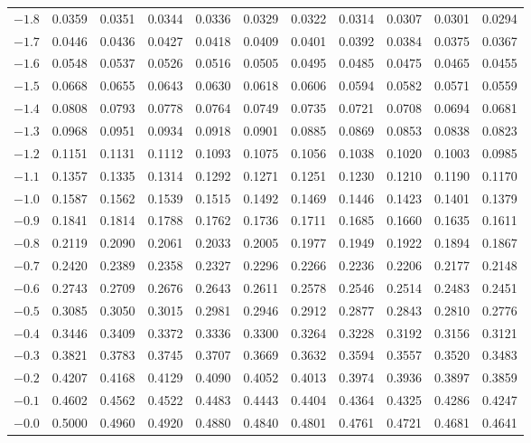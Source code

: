 \begin{table}[H]
\begin{tabular}{c|cccccccccc}
$-1.8$ & 0.0359 & 0.0351 & 0.0344 & 0.0336 & 0.0329 & 0.0322 & 0.0314 & 0.0307 & 0.0301 & 0.0294 \\
$-1.7$ & 0.0446 & 0.0436 & 0.0427 & 0.0418 & 0.0409 & 0.0401 & 0.0392 & 0.0384 & 0.0375 & 0.0367 \\
$-1.6$ & 0.0548 & 0.0537 & 0.0526 & 0.0516 & 0.0505 & 0.0495 & 0.0485 & 0.0475 & 0.0465 & 0.0455 \\
$-1.5$ & 0.0668 & 0.0655 & 0.0643 & 0.0630 & 0.0618 & 0.0606 & 0.0594 & 0.0582 & 0.0571 & 0.0559 \\
$-1.4$ & 0.0808 & 0.0793 & 0.0778 & 0.0764 & 0.0749 & 0.0735 & 0.0721 & 0.0708 & 0.0694 & 0.0681 \\
$-1.3$ & 0.0968 & 0.0951 & 0.0934 & 0.0918 & 0.0901 & 0.0885 & 0.0869 & 0.0853 & 0.0838 & 0.0823 \\
$-1.2$ & 0.1151 & 0.1131 & 0.1112 & 0.1093 & 0.1075 & 0.1056 & 0.1038 & 0.1020 & 0.1003 & 0.0985 \\
$-1.1$ & 0.1357 & 0.1335 & 0.1314 & 0.1292 & 0.1271 & 0.1251 & 0.1230 & 0.1210 & 0.1190 & 0.1170 \\
$-1.0$ & 0.1587 & 0.1562 & 0.1539 & 0.1515 & 0.1492 & 0.1469 & 0.1446 & 0.1423 & 0.1401 & 0.1379 \\
$-0.9$ & 0.1841 & 0.1814 & 0.1788 & 0.1762 & 0.1736 & 0.1711 & 0.1685 & 0.1660 & 0.1635 & 0.1611 \\
$-0.8$ & 0.2119 & 0.2090 & 0.2061 & 0.2033 & 0.2005 & 0.1977 & 0.1949 & 0.1922 & 0.1894 & 0.1867 \\
$-0.7$ & 0.2420 & 0.2389 & 0.2358 & 0.2327 & 0.2296 & 0.2266 & 0.2236 & 0.2206 & 0.2177 & 0.2148 \\
$-0.6$ & 0.2743 & 0.2709 & 0.2676 & 0.2643 & 0.2611 & 0.2578 & 0.2546 & 0.2514 & 0.2483 & 0.2451 \\
$-0.5$ & 0.3085 & 0.3050 & 0.3015 & 0.2981 & 0.2946 & 0.2912 & 0.2877 & 0.2843 & 0.2810 & 0.2776 \\
$-0.4$ & 0.3446 & 0.3409 & 0.3372 & 0.3336 & 0.3300 & 0.3264 & 0.3228 & 0.3192 & 0.3156 & 0.3121 \\
$-0.3$ & 0.3821 & 0.3783 & 0.3745 & 0.3707 & 0.3669 & 0.3632 & 0.3594 & 0.3557 & 0.3520 & 0.3483 \\
$-0.2$ & 0.4207 & 0.4168 & 0.4129 & 0.4090 & 0.4052 & 0.4013 & 0.3974 & 0.3936 & 0.3897 & 0.3859 \\
$-0.1$ & 0.4602 & 0.4562 & 0.4522 & 0.4483 & 0.4443 & 0.4404 & 0.4364 & 0.4325 & 0.4286 & 0.4247 \\
$-0.0$ & 0.5000 & 0.4960 & 0.4920 & 0.4880 & 0.4840 & 0.4801 & 0.4761 & 0.4721 & 0.4681 & 0.4641 \\
\end{tabular}
\end{table}


